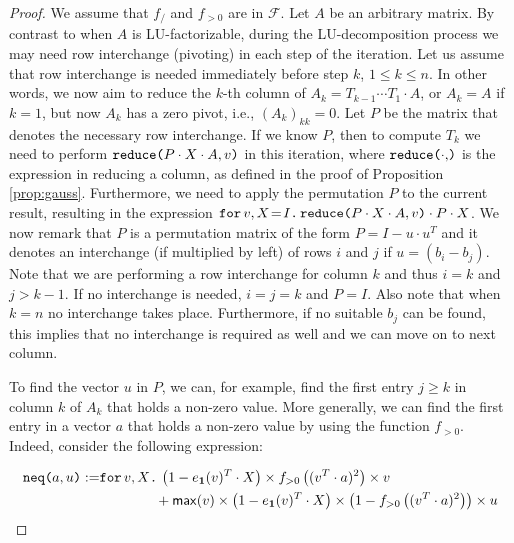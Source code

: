 \begin{proof}

    We assume that $f_{/}$ and $f_{>0}$ are in $\mathcal{F}$. Let $A$ be an arbitrary matrix.
    By contrast to when $A$ is LU-factorizable, during the LU-decomposition process we may need row interchange (pivoting) in each step of the iteration. Let us assume that row interchange is needed immediately before 
    step $k$, $1\leq k\leq n$. In other words, we now aim to reduce the $k$-th column of $A_k=T_{k-1}\cdots T_1\cdot A$, 
    or $A_k=A$ if $k=1$, but now $A_k$ has a zero pivot, i.e., $(A_{k})_{kk}=0$. 
    Let $P$ be the matrix that denotes the necessary row interchange. If we know
    $P$, then 
    to compute $T_k$ we need to perform $\red{P\cdot X\cdot A}{v}$ in this iteration,
    where $\red{\cdot}$ is the expression in \langfor reducing a column, as defined in the proof of Proposition \ref{prop:gauss}.
    Furthermore, we need to apply the permutation $P$ to the current result, resulting in the 
    expression $\initf{I}{v}{X}{\red{P\cdot X\cdot A}{v}\cdot P\cdot X}$. We now remark that
    $P$ is a permutation matrix of the  form $P = I - u\cdot u^T$ and it denotes an interchange (if multiplied by left) of rows $i$ and $j$ if $u=(b_{i}-b_{j})$. Note that we are performing a row interchange for column $k$ and thus $i=k$ and $j>k-1$. If no interchange is needed, $i=j=k$ and $P=I$.
    Also note that when $k=n$ no interchange takes place. Furthermore, if no suitable $b_j$ can
    be found, this implies that no interchange is required as well and we can move on to next column.

    To find the vector $u$ in $P$, we can, for example, find the first entry $j\geq k$ in column $k$ of $A_k$ that holds a non-zero value. More generally, we can find the first entry in a vector $a$ that holds a non-zero value by using the function $f_{>0}$. Indeed, consider the following expression:

    \begin{align*}
       \nneq{a}{u} := &\texttt{for}\, v,X \texttt{.}\, \left( 1-e_{\ones}(v)^T\cdot X \right) \times f_{>0}\left( ( v^T\cdot a )^2 \right)\times v \\
        &\hspace{4em}+ \mathsf{max}(v)\times\left( 1-e_{\ones}(v)^T\cdot X \right)\times \left( 1 - f_{>0}\left( ( v^T\cdot a )^2 \right) \right) \times u \\
    \end{align*}


\end{proof}

